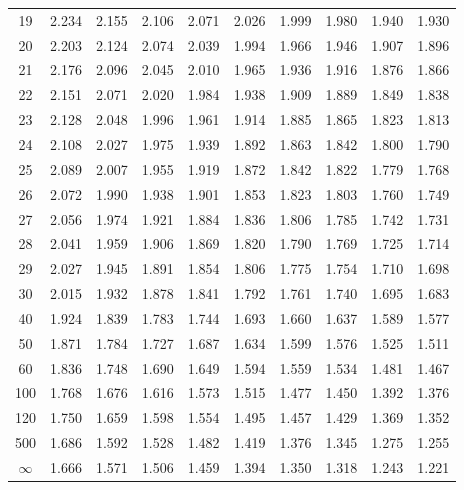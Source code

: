\documentclass[12pt]{article}
\begin{document}
\begin{table}
\begin{center}
{\begin{tabular}{|c|c|c|c|c|c|c|c|c|c|}
	19 & 2.234 &2.155 &2.106 &2.071 &2.026 &1.999 &1.980 &1.940 &1.930\\
	20 & 2.203 &2.124 &2.074 &2.039 &1.994 &1.966 &1.946 &1.907 &1.896\\
	21 & 2.176 &2.096 &2.045 &2.010 &1.965 &1.936 &1.916 &1.876 &1.866\\
	22 & 2.151 &2.071 &2.020 &1.984 &1.938 &1.909 &1.889 &1.849 &1.838\\
	23 & 2.128 &2.048 &1.996 &1.961 &1.914 &1.885 &1.865 &1.823 &1.813\\
	24 & 2.108 &2.027 &1.975 &1.939 &1.892 &1.863 &1.842 &1.800 &1.790\\
	25 & 2.089 &2.007 &1.955 &1.919 &1.872 &1.842 &1.822 &1.779 &1.768\\
	26 & 2.072 &1.990 &1.938 &1.901 &1.853 &1.823 &1.803 &1.760 &1.749\\
	27 & 2.056 &1.974 &1.921 &1.884 &1.836 &1.806 &1.785 &1.742 &1.731\\
	28 & 2.041 &1.959 &1.906 &1.869 &1.820 &1.790 &1.769 &1.725 &1.714\\
	29 & 2.027 &1.945 &1.891 &1.854 &1.806 &1.775 &1.754 &1.710 &1.698\\
	30 & 2.015 &1.932 &1.878 &1.841 &1.792 &1.761 &1.740 &1.695 &1.683\\
	40 & 1.924 &1.839 &1.783 &1.744 &1.693 &1.660 &1.637 &1.589 &1.577\\
	50 & 1.871 &1.784 &1.727 &1.687 &1.634 &1.599 &1.576 &1.525 &1.511\\
	60 & 1.836 &1.748 &1.690 &1.649 &1.594 &1.559 &1.534 &1.481 &1.467\\
	100 & 1.768 &1.676 &1.616 &1.573 &1.515 &1.477 &1.450 &1.392 &1.376\\
	120 & 1.750 &1.659 &1.598 &1.554 &1.495 &1.457 &1.429 &1.369 &1.352\\
	500 & 1.686 &1.592 &1.528 &1.482 &1.419 &1.376 &1.345 &1.275 &1.255\\ \hline
	$\infty$ & 1.666 &1.571 &1.506 &1.459 &1.394 &1.350 &1.318 &1.243 &1.221\\
	\hline
\end{tabular}
}
\end{center}
\end{table}

\end{document}
